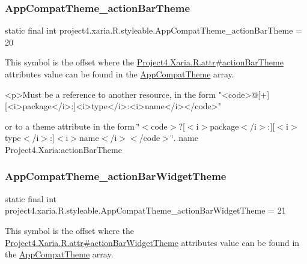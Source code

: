 \subsubsection{\texorpdfstring{App\+Compat\+Theme\+\_\+action\+Bar\+Theme}{AppCompatTheme\_actionBarTheme}}
{\footnotesize\ttfamily static final int project4.\+xaria.\+R.\+styleable.\+App\+Compat\+Theme\+\_\+action\+Bar\+Theme = 20\hspace{0.3cm}{\ttfamily [static]}}

This symbol is the offset where the \hyperlink{}{Project4.\+Xaria.\+R.\+attr\#action\+Bar\+Theme} attribute\textquotesingle{}s value can be found in the \hyperlink{classproject4_1_1xaria_1_1R_1_1styleable_aad8bec413e2350f9404e6ff0e831a85d}{App\+Compat\+Theme} array.

\begin{DoxyVerb}      <p>Must be a reference to another resource, in the form "<code>@[+][<i>package</i>:]<i>type</i>:<i>name</i></code>"
\end{DoxyVerb}
 or to a theme attribute in the form \char`\"{}$<$code$>$?\mbox{[}$<$i$>$package$<$/i$>$\+:\mbox{]}\mbox{[}$<$i$>$type$<$/i$>$\+:\mbox{]}$<$i$>$name$<$/i$>$$<$/code$>$\char`\"{}.  name Project4.\+Xaria\+:action\+Bar\+Theme \mbox{\label{classproject4_1_1xaria_1_1R_1_1styleable_acd160671a7a2ffa11d0fcabb3488ff5f}} 
\subsubsection{\texorpdfstring{App\+Compat\+Theme\+\_\+action\+Bar\+Widget\+Theme}{AppCompatTheme\_actionBarWidgetTheme}}
{\footnotesize\ttfamily static final int project4.\+xaria.\+R.\+styleable.\+App\+Compat\+Theme\+\_\+action\+Bar\+Widget\+Theme = 21\hspace{0.3cm}{\ttfamily [static]}}

This symbol is the offset where the \hyperlink{}{Project4.\+Xaria.\+R.\+attr\#action\+Bar\+Widget\+Theme} attribute\textquotesingle{}s value can be found in the \hyperlink{classproject4_1_1xaria_1_1R_1_1styleable_aad8bec413e2350f9404e6ff0e831a85d}{App\+Compat\+Theme} array.

